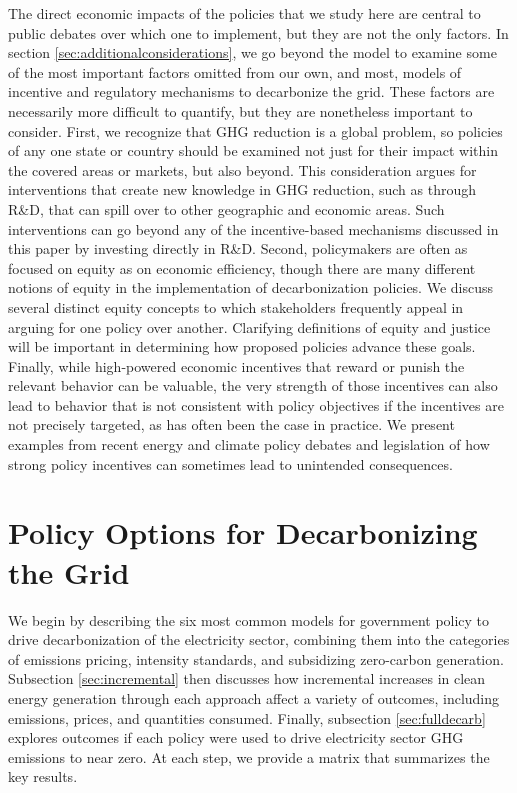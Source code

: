 \documentclass[12pt]{article}
\begin{document}
The direct economic impacts of the policies that we study here are central to public debates over which one to implement, but they are not the only factors. In section \ref{sec:additionalconsiderations}, we go beyond the model to examine some of the most important factors omitted from our own, and most, models of incentive and regulatory mechanisms to decarbonize the grid. These factors are necessarily more difficult to quantify, but they are nonetheless important to consider. First, we recognize that GHG reduction is a global problem, so policies of any one state or country should be examined not just for their impact within the covered areas or markets, but also beyond. This consideration argues for interventions that create new knowledge in GHG reduction, such as through R\&D, that can spill over to other geographic and economic areas. Such interventions can go beyond any of the incentive-based mechanisms discussed in this paper by investing directly in R\&D.  Second, policymakers are often as focused on equity as on economic efficiency, though there are many different notions of equity in the implementation of decarbonization policies. We discuss several distinct equity concepts to which stakeholders frequently appeal in arguing for one policy over another. Clarifying definitions of equity and justice will be important in determining how proposed policies advance these goals. Finally, while high-powered economic incentives that reward or punish the relevant behavior can be valuable, the very strength of those incentives can also lead to behavior that is not consistent with policy objectives if the incentives are not precisely targeted, as has often been the case in practice. We present examples from recent energy and climate policy debates and legislation of how strong policy incentives can sometimes lead to unintended consequences.


\section{Policy Options for Decarbonizing the Grid}\label{sec:matrix}

We begin by describing the six most common models for government policy to drive decarbonization of the electricity sector, combining them into the categories of emissions pricing, intensity standards, and subsidizing zero-carbon generation. Subsection \ref{sec:incremental} then discusses how incremental increases in clean energy generation through each approach affect a variety of outcomes, including emissions, prices, and quantities consumed.  Finally, subsection \ref{sec:fulldecarb} explores outcomes if each policy were used to drive electricity sector GHG emissions to near zero. At each step, we provide a matrix that summarizes the key results.
\end{document}
